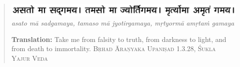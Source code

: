 \chapter{}
\begin{center}
\begin{quote}
\begin{singlespace}
\begin{center}
\includegraphics[scale=0.45]{University/Image/sams_quote_1.pdf}\\
\textit{asato m\={a} sadgamaya, tamaso m\={a} jyotirgamaya, m\d{r}tyorm\={a} am\d{r}ta\.{m} gamaya}\\
\end{center}
\textbf{Translation:} Take me from falsity to truth, from darkness to light,
        and from death to immortality. 
        \textsc{B\d{r}had \={A}ra\d{n}yaka Upani\d{s}ad 1.3.28, \'{S}ukla Yajur Veda}
\end{singlespace}
\end{quote}
\end{center}
